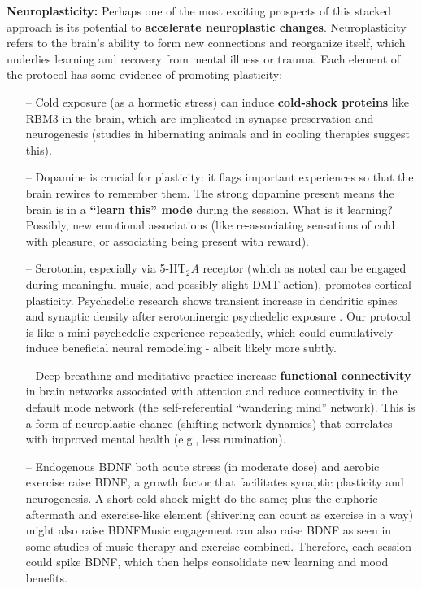 \documentclass[11pt]{article}
\newcommand{\quotes}[1]{``#1''}
\begin{document}
\textbf{Neuroplasticity:} Perhaps one of the most exciting prospects of this stacked approach is its potential to \textbf{accelerate neuroplastic changes}. Neuroplasticity refers to the brain's ability to form new connections and reorganize itself, which underlies learning and recovery from mental illness or trauma. Each element of the protocol has some evidence of promoting plasticity:
\begin{itemize}
\item[--] Cold exposure (as a hormetic stress) can induce \textbf{cold-shock proteins} like RBM3 in the brain, which are implicated in synapse preservation and neurogenesis (studies in hibernating animals and in cooling therapies suggest this).
\item[--] Dopamine is crucial for plasticity: it flags important experiences so that the brain rewires to remember them. The strong dopamine present means the brain is in a \textbf{\quotes{learn this} mode} during the session. What is it learning? Possibly, new emotional associations (like re-associating sensations of cold with pleasure, or associating being present with reward).
\item[--] Serotonin, especially via 5-HT$_2A$ receptor (which as noted can be engaged during meaningful music, and possibly slight DMT action), promotes cortical plasticity. Psychedelic research shows transient increase in dendritic spines and synaptic density after serotoninergic psychedelic exposure \cite{Dean2019}. Our protocol is like a mini-psychedelic experience repeatedly, which could cumulatively induce beneficial neural remodeling - albeit likely more subtly.
\item[--] Deep breathing and meditative practice increase \textbf{functional connectivity} in brain networks associated with attention and reduce connectivity in the default mode network (the self-referential \quotes{wandering mind} network). This is a form of neuroplastic change (shifting network dynamics) that correlates with improved mental health (e.g., less rumination).
\item[--] Endogenous BDNF\: both acute stress (in moderate dose) and aerobic exercise raise BDNF, a growth factor that facilitates synaptic plasticity and neurogenesis. A short cold shock might do the same; plus the euphoric aftermath and exercise-like element (shivering can count as exercise in a way) might also raise BDNF\. Music engagement can also raise BDNF as seen in some studies of music therapy and exercise combined. Therefore, each session could spike BDNF, which then helps consolidate new learning and mood benefits.

\end{itemize}
\end{document}
